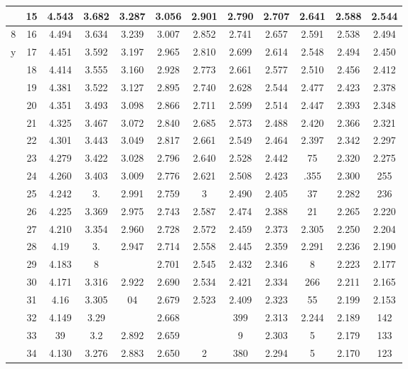 \documentclass[10pt]{article}
\begin{document}
\begin{CJK*}{UTF8}{bsmi}
\begin{center}
\begin{tabular}{|c|c|c|c|c|c|c|c|c|c|c|c|}
\hline
 & 15 & 4.543 & 3.682 & 3.287 & 3.056 & 2.901 & 2.790 & 2.707 & 2.641 & 2.588 & 2.544 \\
\hline
8 & 16 & 4.494 & 3.634 & 3.239 & 3.007 & 2.852 & 2.741 & 2.657 & 2.591 & 2.538 & 2.494 \\
\hline
y & 17 & 4.451 & 3.592 & 3.197 & 2.965 & 2.810 & 2.699 & 2.614 & 2.548 & 2.494 & 2.450 \\
\hline
 & 18 & 4.414 & 3.555 & 3.160 & 2.928 & 2.773 & 2.661 & 2.577 & 2.510 & 2.456 & 2.412 \\
\hline
 & 19 & 4.381 & 3.522 & 3.127 & 2.895 & 2.740 & 2.628 & 2.544 & 2.477 & 2.423 & 2.378 \\
\hline
 & 20 & 4.351 & 3.493 & 3.098 & 2.866 & 2.711 & 2.599 & 2.514 & 2.447 & 2.393 & 2.348 \\
\hline
 & 21 & 4.325 & 3.467 & 3.072 & 2.840 & 2.685 & 2.573 & 2.488 & 2.420 & 2.366 & 2.321 \\
\hline
 & 22 & 4.301 & 3.443 & 3.049 & 2.817 & 2.661 & 2.549 & 2.464 & 2.397 & 2.342 & 2.297 \\
\hline
 & 23 & 4.279 & 3.422 & 3.028 & 2.796 & 2.640 & 2.528 & 2.442 & 75 & 2.320 & 2.275 \\
\hline
 & 24 & 4.260 & 3.403 & 3.009 & 2.776 & 2.621 & 2.508 & 2.423 & .355 & 2.300 & 255 \\
\hline
 & 25 & 4.242 & 3. & 2.991 & 2.759 & 3 & 2.490 & 2.405 & 37 & 2.282 & 236 \\
\hline
 & 26 & 4.225 & 3.369 & 2.975 & 2.743 & 2.587 & 2.474 & 2.388 & 21 & 2.265 & 2.220 \\
\hline
 & 27 & 4.210 & 3.354 & 2.960 & 2.728 & 2.572 & 2.459 & 2.373 & 2.305 & 2.250 & 2.204 \\
\hline
 & 28 & 4.19 & 3. & 2.947 & 2.714 & 2.558 & 2.445 & 2.359 & 2.291 & 2.236 & 2.190 \\
\hline
 & 29 & 4.183 & 8 &  & 2.701 & 2.545 & 2.432 & 2.346 & 8 & 2.223 & 2.177 \\
\hline
 & 30 & 4.171 & 3.316 & 2.922 & 2.690 & 2.534 & 2.421 & 2.334 & 266 & 2.211 & 2.165 \\
\hline
 & 31 & 4.16 & 3.305 & 04 & 2.679 & 2.523 & 2.409 & 2.323 & 55 & 2.199 & 2.153 \\
\hline
 & 32 & 4.149 & 3.29 &  & 2.668 &  & 399 & 2.313 & 2.244 & 2.189 & 142 \\
\hline
 & 33 & 39 & 3.2 & 2.892 & 2.659 &  & 9 & 2.303 & 5 & 2.179 & 133 \\
\hline
 & 34 & 4.130 & 3.276 & 2.883 & 2.650 & 2 & 380 & 2.294 & 5 & 2.170 & 123 \\

\end{tabular}
\end{center}
\end{CJK*}
\end{document}
